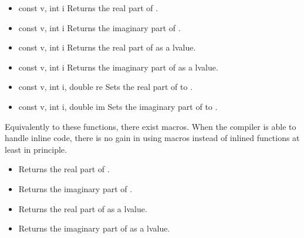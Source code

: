 \begin{itemize}
\item {}
  {const  \ptr v, int i}
  \sshortdescribe Returns the real part of .
  
\item {}
  {const  \ptr v, int i}
  \sshortdescribe Returns the imaginary part of .

\item {}
  {const  \ptr v, int i}
  \sshortdescribe Returns the real part of  as a lvalue.

\item {}
  {const  \ptr v, int i}
  \sshortdescribe Returns the imaginary part of  as a lvalue.

\item {}
  {const  \ptr v, int i, double re}
  \sshortdescribe Sets the real part of  to .

\item {}
  {const  \ptr v, int i, double im}
  \sshortdescribe Sets the imaginary part of  to .
\end{itemize}

Equivalently to these functions, there exist macros. When the compiler is able
to handle inline code, there is no gain in using macros instead of inlined
functions at least in principle.
\begin{itemize}
\item {}
  \sshortdescribe Returns the real part of .
  
\item {}
  \sshortdescribe Returns the imaginary part of .
  
\item {}
  \sshortdescribe Returns the real part of  as a lvalue.
  
\item {}
  \sshortdescribe Returns the imaginary part of  as a lvalue.
\end{itemize}

